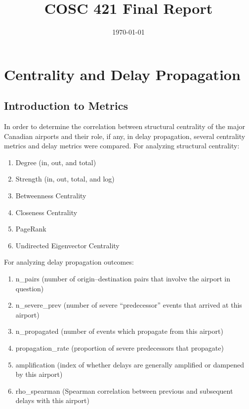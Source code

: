 \documentclass[10pt]{article}
\title{COSC 421 Final Report}
\date{\today}
\begin{document}
\maketitle

\section{Centrality and Delay Propagation}
\subsection{Introduction to Metrics}

In order to determine the correlation between structural centrality of the major Canadian airports and their role, if any, in delay propagation, several centrality metrics and delay metrics were compared. For analyzing structural centrality:

\begin{enumerate}[label=\arabic*.]
    \item Degree (in, out, and total)
    \item Strength (in, out, total, and log)
    \item Betweenness Centrality
    \item Closeness Centrality
    \item PageRank
    \item Undirected Eigenvector Centrality
\end{enumerate}

\noindent
For analyzing delay propagation outcomes:

\begin{enumerate}[label=\arabic*.]
    \item n\_pairs (number of origin–destination pairs that involve the airport in question)
    \item n\_severe\_prev (number of severe ``predecessor'' events that arrived at this airport)
    \item n\_propagated (number of events which propagate from this airport)
    \item propagation\_rate (proportion of severe predecessors that propagate)
    \item amplification (index of whether delays are generally amplified or dampened by this airport)
    \item rho\_spearman (Spearman correlation between previous and subsequent delays with this airport)
\end{enumerate}
\end{document}

